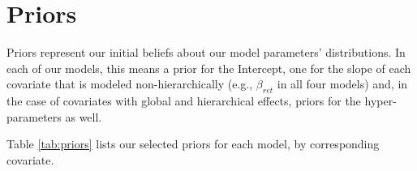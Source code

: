 \documentclass[12pt]{article}
\begin{document}
\section{Priors} \label{sec:priors}

Priors represent our initial beliefs about our model parameters' distributions.
In each of our models, this means a prior for the Intercept, one for the slope of each covariate that is modeled non-hierarchically (e.g., $\beta_{ret}$ in all four models) and, in the case of covariates with global and hierarchical effects, priors for the hyper-parameters as well.

Table \ref{tab:priors} lists our selected priors for each model, by corresponding covariate.

\begin{table}[h]
\end{table}
\end{document}
